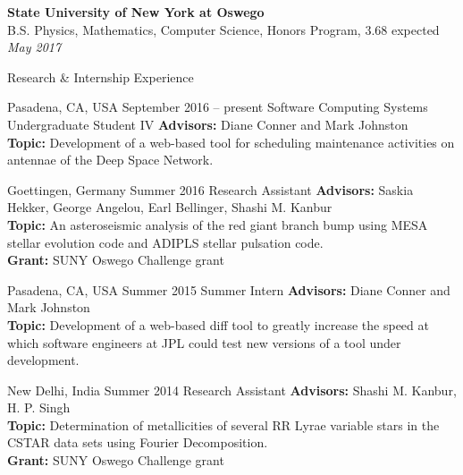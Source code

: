 \documentclass{resume} %
\begin{document}
\textbf{State University of New York at Oswego}
\\
B.S. Physics, Mathematics, Computer Science, Honors Program, 3.68
\hfill
expected \emph{May 2017}

\begin{rSection}{Research \& Internship Experience}{}

           {Pasadena, CA, USA}
           {September 2016 -- present}
           {Software Computing Systems Undergraduate Student IV}
           {
    \textbf{Advisors:}
    Diane Conner and Mark Johnston
    \\
    \textbf{Topic:}
    Development of a web-based tool for scheduling maintenance activities on
    antennae of the Deep Space Network.
  }

           {Goettingen, Germany}
           {Summer 2016}
           {Research Assistant}
           {
    \textbf{Advisors:}
    Saskia Hekker, George Angelou, Earl Bellinger, Shashi M. Kanbur
    \\
    \textbf{Topic:}
    An asteroseismic analysis of the red giant branch bump using MESA stellar
    evolution code and ADIPLS stellar pulsation code.
    \\
    \textbf{Grant:}
    SUNY Oswego Challenge grant
  }

           {Pasadena, CA, USA}
           {Summer 2015}
           {Summer Intern}
           {
    \textbf{Advisors:}
    Diane Conner and Mark Johnston
    \\
    \textbf{Topic:}
    Development of a web-based diff tool to greatly increase the speed at which
    software engineers at JPL could test new versions of a tool under
    development.
  }

           {New Delhi, India}
           {Summer 2014}
           {Research Assistant}
           {
    \textbf{Advisors:}
    Shashi M. Kanbur, H. P. Singh
    \\
    \textbf{Topic:}
    Determination of metallicities of several RR Lyrae variable stars in the
    CSTAR data sets using Fourier Decomposition.
    \\
    \textbf{Grant:}
    SUNY Oswego Challenge grant
  }

\end{rSection}
\end{document}
